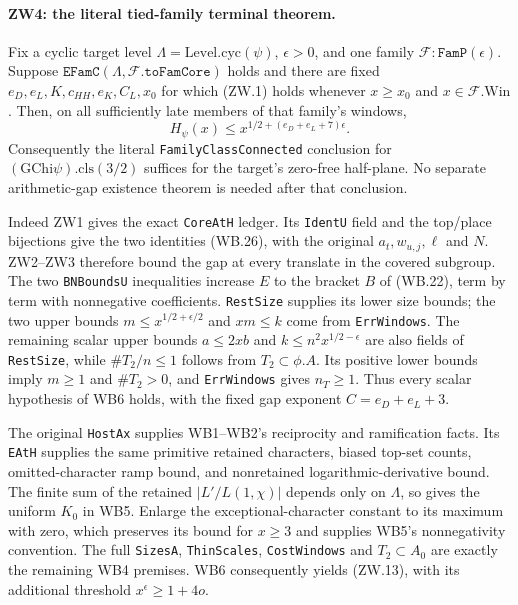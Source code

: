 \paragraph{ZW4: the literal tied-family terminal theorem.}
\label{claim:ZW4}
Fix a cyclic target level $\Lambda=\mathrm{Level.cyc}(\psi)$,
$\epsilon>0$, and one family $\mathcal F:\texttt{FamP}(\epsilon)$.
Suppose $\texttt{EFamC}(\Lambda,\mathcal F.\texttt{toFamCore})$ holds
and there are fixed $e_D,e_L,K,c_{HH},e_K,C_L,x_0$ for which (ZW.1)
holds whenever $x\ge x_0$ and $x\in\mathcal F.\mathrm{Win}$.
Then, on all sufficiently late members of that family's windows,
\[
                    H_\psi(x)\le
                         x^{1/2+(e_D+e_L+7)\epsilon}.             \tag{ZW.13}
\]
Consequently the literal \texttt{FamilyClassConnected} conclusion for
$(\mathrm{GChi}\psi).\mathrm{cls}(3/2)$ suffices for the target's
zero-free half-plane.  No separate arithmetic-gap existence theorem is
needed after that conclusion.

Indeed ZW1 gives the exact \texttt{CoreAtH} ledger.  Its
\texttt{IdentU} field and the top/place bijections give the two
identities (WB.26), with the original $a_t,w_{u,j},\ell$ and $N$.
ZW2--ZW3 therefore bound the gap at every translate in the covered
subgroup.  The two \texttt{BNBoundsU} inequalities increase $E$ to
the bracket $B$ of (WB.22), term by term with nonnegative
coefficients.  \texttt{RestSize} supplies its lower size bounds;
the two upper bounds $m\le x^{1/2+\epsilon/2}$ and $xm\le k$
come from \texttt{ErrWindows}.  The remaining scalar upper bounds
$a\le2xb$ and $k\le n^2x^{1/2-\epsilon}$ are also fields of
\texttt{RestSize}, while $\#T_2/n\le1$ follows from $T_2\subset\phi.A$.
Its positive lower bounds imply $m\ge1$ and $\#T_2>0$, and
\texttt{ErrWindows} gives $n_T\ge1$.  Thus every scalar hypothesis
of WB6 holds, with the fixed gap exponent $C=e_D+e_L+3$.

The original \texttt{HostAx} supplies WB1--WB2's reciprocity and
ramification facts.  Its \texttt{EAtH} supplies the same primitive
retained characters, biased top-set counts, omitted-character ramp
bound, and nonretained logarithmic-derivative bound.  The finite sum
of the retained $|L'/L(1,\chi)|$ depends only on $\Lambda$, so gives
the uniform $K_0$ in WB5.  Enlarge the exceptional-character
constant to its maximum with zero, which preserves its bound for
$x\ge3$ and supplies WB5's nonnegativity convention.
The full \texttt{SizesA},
\texttt{ThinScales}, \texttt{CostWindows} and $T_2\subset A_0$
are exactly the remaining WB4 premises.  WB6 consequently yields
(ZW.13), with its additional threshold $x^\epsilon\ge1+4o$.

